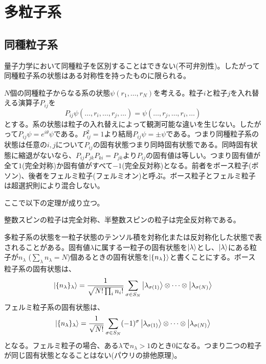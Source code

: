 \section{多粒子系}

\subsection{同種粒子系}
    量子力学において同種粒子を区別することはできない(不可弁別性)。したがって同種粒子系の状態はある対称性を持ったものに限られる。
    
    $N$個の同種粒子からなる系の状態$\psi(r_1, \dots, r_N)$を考える。粒子$i$と粒子$j$を入れ替える演算子$P_{ij}$を
        \[P_{ij}\psi(\dots, r_i, \dots, r_j, \dots) = \psi(\dots, r_j, \dots, r_i, \dots)\]
    とする。系の状態は粒子の入れ替えによって観測可能な違いを生じない。したがって$P_{ij}\psi = e^{i\theta}\psi$である。$P_{ij}^2 = 1$より結局$P_{ij}\psi = \pm \psi$である。つまり同種粒子系の状態は任意の$i, j$について$P_{ij}$の固有状態つまり同時固有状態である。同時固有状態に縮退がないなら、$P_{ij}P_{jk}P_{ki} = P_{jk}$より$P_{ij}$の固有値は等しい。つまり固有値が全て$1$(完全対称)か固有値がすべて$-1$(完全反対称)となる。前者をボース粒子(ボソン)、後者をフェルミ粒子(フェルミオン)と呼ぶ。ボース粒子とフェルミ粒子は超選択則により混合しない。
    
    ここで以下の定理が成り立つ。
    \begin{thm}[スピンと統計の定理]
        整数スピンの粒子は完全対称、半整数スピンの粒子は完全反対称である。
    \end{thm}

    多粒子系の状態を一粒子状態のテンソル積を対称化または反対称化した状態で表されることがある。固有値$\lambda$に属する一粒子の固有状態を$\ket{\lambda}$とし、$\ket{\lambda}$にある粒子が$n_\lambda$ ($\sum_\lambda n_\lambda = N$)個あるときの固有状態を$\ket{\{n_\lambda\}}$と書くことにする。ボース粒子系の固有状態は、
        \[\ket{\{n_\lambda\}_\lambda} = \frac{1}{\sqrt{N! \prod_i n_i!}} \sum_{\sigma \in S_N} \ket{\lambda_{\sigma(1)}} \otimes \dots \otimes \ket{\lambda_{\sigma(N)}}\]
    フェルミ粒子系の固有状態は、
        \[\ket{\{n_\lambda\}_\lambda} = \frac{1}{\sqrt{N!}} \sum_{\sigma \in S_N} (-1)^\sigma \ket{\lambda_{\sigma(1)}} \otimes \dots \otimes \ket{\lambda_{\sigma(N)}}\]
    となる。フェルミ粒子の場合、ある$\lambda$で$n_\lambda > 1$のとき0になる。つまり二つの粒子が同じ固有状態となることはない(パウリの排他原理)。

